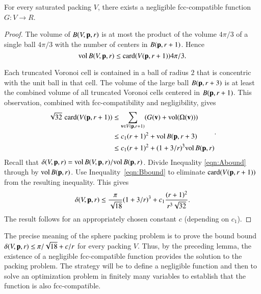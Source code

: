 \begin{conjecture}\label{conj:fcc-neg}
For every saturated packing $ V$, there exists a negligible fcc-compatible function
$G: V\to R$.
\end{conjecture}



\begin{proof}
The volume of $B( V,{\mathbf p},r)$ 
is at most the product of the volume $4\pi/3$ of a single ball $4\pi/3$ with the
number of centers in $B({\mathbf p},r+1)$.  
Hence
    \begin{equation}
    {\operatorname{vol}}\, B( V,{\mathbf p},r) \le {\operatorname{card}}( V({\mathbf p},r+1)) 4\pi/3.
    \label{eqn:Abound}
    \end{equation}

Each truncated Voronoi cell is contained in a ball of
radius $2$ that is concentric with the unit ball in that cell.  The volume
of the large ball $B({\mathbf p},r+3)$ is at least the combined volume of 
all truncated Voronoi
cells centered in $B({\mathbf p},r+1)$. This observation,
combined with fcc-compatibility and negligibility, gives
    \begin{equation}
    \begin{split}
    \sqrt{32}\,\,{\operatorname{card}}( V({\mathbf p},r+1))
    &\le \sum_{{\mathbf v}\in V({\mathbf p},r+1)} (G({\mathbf v}) +
    {\operatorname{vol}}(\Omega({\mathbf v}))) \\
    &\le c_1 (r+1)^2 + {\operatorname{vol}}\,B({\mathbf p},r+3) \\
    &\le c_1 (r+1)^2 + (1+3/r)^3 {\operatorname{vol}}\,B({\mathbf p},r)
    \label{eqn:Bbound}
    \end{split}.
    \end{equation}
%
Recall that $\delta( V,{\mathbf p},r)=
{\operatorname{vol}}\,B( V,{\mathbf p},r)/{\operatorname{vol}}\,B({\mathbf p},r)$. Divide Inequality
\ref{eqn:Abound} through by ${\operatorname{vol}}\,B({\mathbf p},r)$.  Use
Inequality~\ref{eqn:Bbound} to eliminate ${\operatorname{card}}( V({\mathbf p},r+1))$ from the
resulting inequality.  This gives
    $$\delta( V,{\mathbf p},r)
        \le \frac{\pi}{\sqrt{18}} (1+3/r)^3 + c_1 \frac{(r+1)^2}{r^3\sqrt{32}}.
    $$
The result follows for an appropriately chosen constant $c$ (depending on $c_1$).
\end{proof}

\begin{remark} \label{remark:precise}
The precise meaning of the sphere packing problem is to prove the bound
bound $\delta( V,{\mathbf p},r) \le \pi/\sqrt{18} + c/r$ for every packing $ V$.  Thus, by the preceding lemma, the existence of a negligible
fcc-compatible function provides the solution to the packing problem. 
The strategy will be to
define a negligible function and then to solve an optimization
problem in finitely many variables to establish that the function is also
fcc-compatible.
\end{remark}



